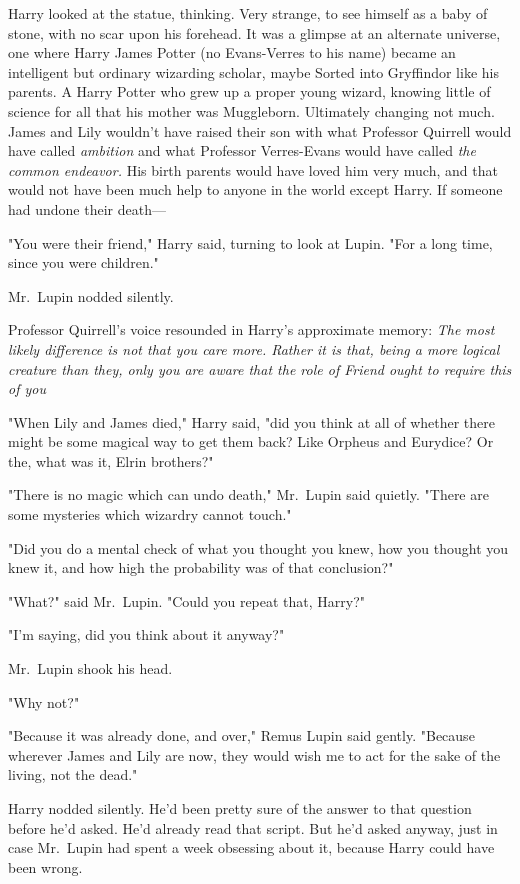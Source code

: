 Harry looked at the statue, thinking. Very strange, to see himself as a baby of
stone, with no scar upon his forehead. It was a glimpse at an alternate
universe, one where Harry James Potter (no Evans-Verres to his name) became an
intelligent but ordinary wizarding scholar, maybe Sorted into Gryffindor like
his parents. A Harry Potter who grew up a proper young wizard, knowing little
of science for all that his mother was Muggleborn. Ultimately changing{\el}
not much. James and Lily wouldn't have raised their son with what Professor
Quirrell would have called \emph{ambition} and what Professor Verres-Evans
would have called \emph{the common endeavor.} His birth parents would have
loved him very much, and that would not have been much help to anyone in the
world except Harry. If someone had undone their death—

"You were their friend," Harry said, turning to look at Lupin. "For a long
time, since you were children."

Mr.~Lupin nodded silently.

Professor Quirrell's voice resounded in Harry's approximate memory: \emph{The
most likely difference is not that you care more. Rather it is that, being a
more logical creature than they, only you are aware that the role of Friend
ought to require this of you{\el}}

"When Lily and James died," Harry said, "did you think at all of whether there
might be some magical way to get them back? Like Orpheus and Eurydice? Or the,
what was it, Elrin brothers?"

"There is no magic which can undo death," Mr.~Lupin said quietly. "There are
some mysteries which wizardry cannot touch."

"Did you do a mental check of what you thought you knew, how you thought you
knew it, and how high the probability was of that conclusion?"

"What?" said Mr.~Lupin. "Could you repeat that, Harry?"

"I'm saying, did you think about it anyway?"

Mr.~Lupin shook his head.

"Why not?"

"Because it was already done, and over," Remus Lupin said gently. "Because
wherever James and Lily are now, they would wish me to act for the sake of the
living, not the dead."

Harry nodded silently. He'd been pretty sure of the answer to that question
before he'd asked. He'd already read that script. But he'd asked anyway, just
in case Mr.~Lupin had spent a week obsessing about it, because Harry could have
been wrong.

